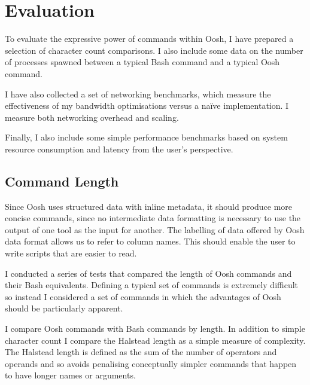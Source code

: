 \documentclass[12pt,twoside,notitlepage]{report}
\begin{document}
\cleardoublepage

\chapter{Evaluation}
To evaluate the expressive power of commands within Oosh, I have prepared a
selection of character count comparisons. I also include some data on the
number of processes spawned between a typical Bash command and a typical Oosh
command.

I have also collected a set of networking benchmarks, which measure
the effectiveness of my bandwidth optimisations versus a na\"{i}ve
implementation. I measure both networking overhead and scaling.

Finally, I also include some simple performance benchmarks based on
system resource consumption and latency from the user's perspective.

\section{Command Length}
\label{commandlength}
Since Oosh uses structured data with inline metadata, it should
produce more concise commands, since no intermediate data formatting
is necessary to use the output of one tool as the input for
another. The labelling of data offered by Oosh data format allows us
to refer to column names. This should enable the user to write scripts
that are easier to read. 

I conducted a series of tests that compared the length of Oosh
commands and their Bash equivalents. Defining a typical set of
commands is extremely difficult so instead I considered a set of
commands in which the advantages of Oosh should be particularly
apparent.

I compare Oosh commands with Bash commands by length. In addition to
simple character count I compare the Halstead length \cite{halstead}
as a simple measure of complexity. The Halstead length is defined as
the sum of the number of operators and operands and so avoids penalising
conceptually simpler commands that happen to have longer names or arguments.
\end{document}
